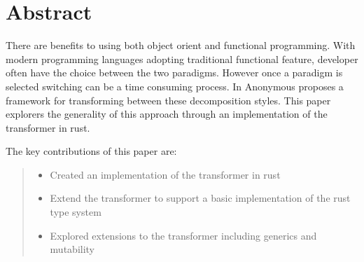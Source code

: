 \documentclass[ oneside,%
                    author={James Elgar},
                    degree={MEng},
                     title={Bidirectional transformer between functional and \\ object-oriented programming in Rust},
                  subtitle={}]{dissertation}
\newcommand{\weixin}{Anonymous }
\begin{document}


\maketitle


\frontmatter





\chapter*{Abstract}

There are benefits to using both object orient and functional programming. With modern programming languages adopting traditional functional feature, developer often have the choice between the two paradigms. However once a paradigm is selected switching can be a time consuming process. In \cite{food} \weixin proposes a framework for transforming between these decomposition styles. This paper explorers the generality of this approach through an implementation of the transformer in rust. 

The key contributions of this paper are:

\begin{quote}
\noindent
\begin{itemize}
    \item Created an implementation of the \cite{food} transformer in rust
    \item Extend the \cite{food} transformer to support a basic implementation of the rust type system
    \item Explored extensions to the transformer including generics and mutability
\end{itemize}
\end{quote}
\end{document}
